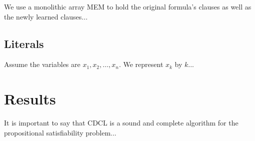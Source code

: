 We use a monolithic array MEM to hold the original formula’s clauses as well as the newly learned clauses...

\subsection{Literals}

Assume the variables are \(x_1, x_2, \ldots, x_n\). We represent \(x_k\) by \(k\)...

\section{Results}

It is important to say that CDCL is a sound and complete algorithm for the propositional satisfiability problem...

